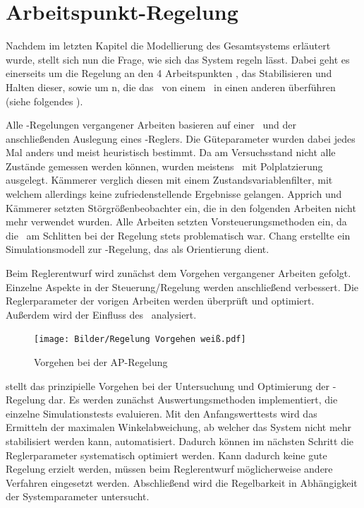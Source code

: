 \chapter{Arbeitspunkt-Regelung}\label{cha:apr}

Nachdem im letzten Kapitel die Modellierung des Gesamtsystems erläutert wurde, stellt sich nun die Frage, wie sich das System regeln lässt. Dabei geht es einerseits um die Regelung an den 4 Arbeitspunkten , \dah das Stabilisieren und Halten dieser, sowie um \traj n, die das \dpd\ von einem \ap\ in einen anderen überführen (siehe folgendes ).

Alle \ap -Regelungen vergangener Arbeiten basieren auf einer \lin\ und der anschließenden Auslegung eines \ricc-Reglers.
Die Güteparameter wurden dabei jedes Mal anders und meist heuristisch bestimmt.
Da am Versuchsstand nicht alle Zustände gemessen werden können, wurden meistens \beob\ mit Polplatzierung ausgelegt.
Kämmerer \cite{kämmerer} verglich diesen mit einem Zustandsvariablenfilter, mit welchem allerdings keine zufriedenstellende Ergebnisse gelangen.
Apprich \cite{apprich} und Kämmerer \cite{kämmerer} setzten Störgrößenbeobachter ein, die in den folgenden Arbeiten nicht mehr verwendet wurden.
Alle Arbeiten setzten Vorsteuerungsmethoden ein, da die \crb\ am Schlitten bei der Regelung stets problematisch war.
Chang \cite{chang} erstellte ein Simulationsmodell zur \ap-Regelung, das als Orientierung dient.

Beim Reglerentwurf wird zunächst dem Vorgehen vergangener Arbeiten gefolgt. 
Einzelne Aspekte in der Steuerung/Regelung werden anschließend verbessert.
Die Reglerparameter der vorigen Arbeiten werden überprüft und optimiert.
Außerdem wird der Einfluss des \beob\ analysiert.

\begin{figure}[h]
	\centering
		\texttt{[image: Bilder/Regelung Vorgehen weiß.pdf]}
	\caption{Vorgehen bei der AP-Regelung }
	\label{fig:regvorg}
\end{figure}

 stellt das prinzipielle Vorgehen bei der Untersuchung und Optimierung der \ap-Regelung dar.
Es werden zunächst Auswertungsmethoden implementiert, die einzelne Simulationstests evaluieren.
Mit den Anfangswerttests wird das Ermitteln der maximalen Winkelabweichung, ab welcher das System nicht mehr stabilisiert werden kann, automatisiert.
Dadurch können im nächsten Schritt die Reglerparameter systematisch optimiert werden.
Kann dadurch keine gute Regelung erzielt werden, müssen beim Reglerentwurf möglicherweise andere Verfahren eingesetzt werden.
Abschließend wird die Regelbarkeit in Abhängigkeit der Systemparameter untersucht.

